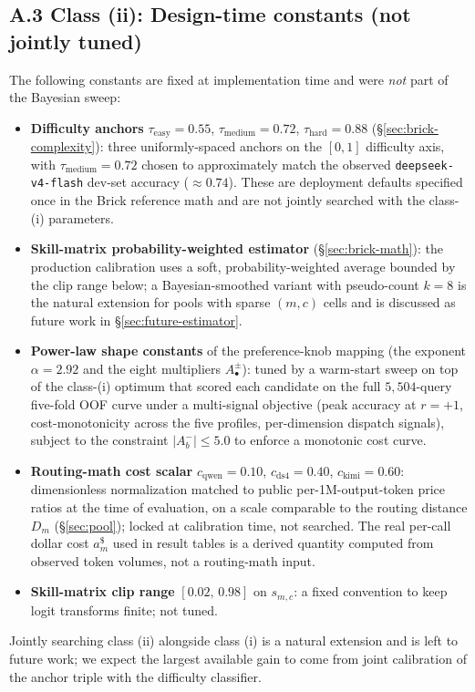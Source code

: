 \documentclass[twocolumn,10pt,a4paper]{article}
\begin{document}
\subsection*{A.3 Class (ii): Design-time constants (not jointly tuned)}
The following constants are fixed at implementation time and were \emph{not} part of the Bayesian sweep:
\begin{itemize}\setlength{\itemsep}{3pt}
  \item \textbf{Difficulty anchors} $\tau_\text{easy}{=}0.55$, $\tau_\text{medium}{=}0.72$, $\tau_\text{hard}{=}0.88$ (§\ref{sec:brick-complexity}): three uniformly-spaced anchors on the $[0,1]$ difficulty axis, with $\tau_\text{medium}{=}0.72$ chosen to approximately match the observed \texttt{deepseek-v4-flash} dev-set accuracy ($\approx 0.74$). These are deployment defaults specified once in the Brick reference math and are not jointly searched with the class-(i) parameters.
  \item \textbf{Skill-matrix probability-weighted estimator} (§\ref{sec:brick-math}): the production calibration uses a soft, probability-weighted average bounded by the clip range below; a Bayesian-smoothed variant with pseudo-count $k{=}8$ is the natural extension for pools with sparse $(m,c)$ cells and is discussed as future work in §\ref{sec:future-estimator}.
  \item \textbf{Power-law shape constants} of the preference-knob mapping (the exponent $\alpha{=}2.92$ and the eight multipliers $A_{\bullet}^{\pm}$): tuned by a warm-start sweep on top of the class-(i) optimum that scored each candidate on the full $5{,}504$-query five-fold OOF curve under a multi-signal objective (peak accuracy at $r{=}{+}1$, cost-monotonicity across the five profiles, per-dimension dispatch signals), subject to the constraint $|A_b^{-}|\!\le\!5.0$ to enforce a monotonic cost curve.
  \item \textbf{Routing-math cost scalar} $c_\text{qwen}{=}0.10$, $c_\text{ds4}{=}0.40$, $c_\text{kimi}{=}0.60$: dimensionless normalization matched to public per-1M-output-token price ratios at the time of evaluation, on a scale comparable to the routing distance $D_m$ (§\ref{sec:pool}); locked at calibration time, not searched. The real per-call dollar cost $a_m^{\$}$ used in result tables is a derived quantity computed from observed token volumes, not a routing-math input.
  \item \textbf{Skill-matrix clip range} $[0.02,\,0.98]$ on $s_{m,c}$: a fixed convention to keep logit transforms finite; not tuned.
\end{itemize}
Jointly searching class (ii) alongside class (i) is a natural extension and is left to future work; we expect the largest available gain to come from joint calibration of the anchor triple with the difficulty classifier.
\end{document}
